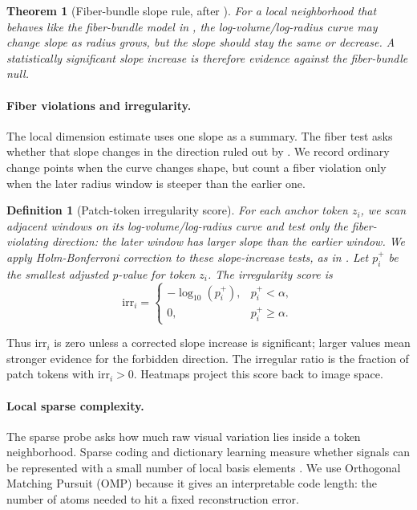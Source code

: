 \documentclass{article}
\newcommand{\irr}{\mathrm{irr}}
\newtheorem{definition}{Definition}
\newtheorem{theorem}{Theorem}
\begin{document}
\begin{theorem}[Fiber-bundle slope rule, after \citet{robinson2025token}]
\label{thm:fiber-monotone}
For a local neighborhood that behaves like the fiber-bundle model in \citet{robinson2025token}, the log-volume/log-radius curve may change slope as radius grows, but the slope should stay the same or decrease. A statistically significant slope increase is therefore evidence against the fiber-bundle null.
\end{theorem}

\paragraph{Fiber violations and irregularity.}
The local dimension estimate uses one slope as a summary. The fiber test asks whether that slope changes in the direction ruled out by . We record ordinary change points when the curve changes shape, but count a fiber violation only when the later radius window is steeper than the earlier one.

\begin{definition}[Patch-token irregularity score]
For each anchor token $z_i$, we scan adjacent windows on its log-volume/log-radius curve and test only the fiber-violating direction: the later window has larger slope than the earlier window. We apply Holm-Bonferroni correction \citep{holm1979simple} to these slope-increase tests, as in \citet{robinson2025token}. Let $p_i^+$ be the smallest adjusted p-value for token $z_i$. The irregularity score is
\begin{equation}
  \irr_i =
  \begin{cases}
  -\log_{10}(p_i^+), & p_i^+<\alpha,\\
  0, & p_i^+\ge \alpha.
  \end{cases}
\end{equation}
\end{definition}

Thus $\irr_i$ is zero unless a corrected slope increase is significant; larger values mean stronger evidence for the forbidden direction. The irregular ratio is the fraction of patch tokens with $\irr_i>0$. Heatmaps project this score back to image space.

\paragraph{Local sparse complexity.}
The sparse probe asks how much raw visual variation lies inside a token neighborhood. Sparse coding and dictionary learning measure whether signals can be represented with a small number of local basis elements \citep{olshausen1996emergence,mairal2009online}. We use Orthogonal Matching Pursuit (OMP) \citep{pati1993orthogonal,tropp2007signal} because it gives an interpretable code length: the number of atoms needed to hit a fixed reconstruction error.
\end{document}
